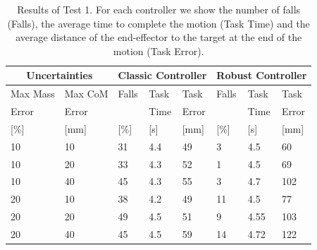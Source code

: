\begin{table}[!tbph]
\begin{center}
\caption{Results of Test 1. For each controller we show the number of falls (Falls), the average time to complete the motion (Task Time) and the average distance of the end-effector to the target at the end of the motion (Task Error).}
\begin{tabular}{ |l|l|l|l|l|l|l|l| }
\hline
\multicolumn{2}{|c|}{Uncertainties}&\multicolumn{3}{|c|}{Classic Controller}&\multicolumn{3}{|c|}{Robust Controller}\\
\hline Max Mass & Max CoM &{Falls}& Task &{Task} & Falls & Task& Task  \\
Error & Error & & Time   &  Error & &  Time & Error\\ 
{[\%]} & [mm] & [\%]  &  [s]  &  [mm]  & [\%]  &  [s] & [mm]\\ 
\hline
10 & 10 & 31 & 4.4 & 49 & 3 & 4.5 & 60\\
10 & 20 & 33 & 4.3 & 52 & 1 & 4.5 & 69 \\
10 & 40 & 45 & 4.3 & 55 & 3 & 4.7 & 102\\ 
20 & 10 & 38 & 4.2 & 49 & 11 & 4.5 & 77\\
20 & 20 & 49 & 4.5 & 51 & 9 & 4.55 & 103 \\
20 & 40 & 45 & 4.5 & 59 & 14 & 4.72 & 122 \\
\hline
\end{tabular}
\label{tab:test1}
\end{center}
\end{table}
